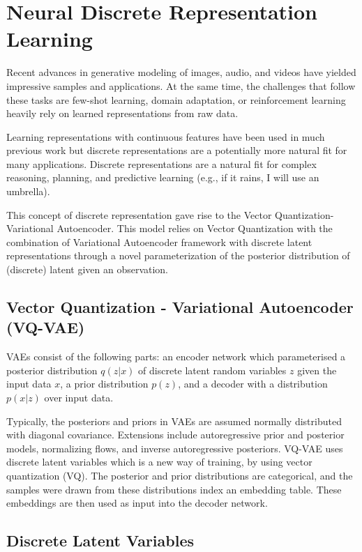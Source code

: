 \section{Neural Discrete Representation Learning}

Recent advances in generative modeling of images, audio, and videos have yielded impressive
samples and applications. At the same time, the challenges that follow these tasks are few-shot
learning, domain adaptation, or reinforcement learning heavily rely on learned representations from raw data.

Learning representations with continuous features have been used in much previous work but discrete representations are a potentially more natural fit for many applications. 
Discrete representations are a natural fit for complex reasoning, planning, and predictive learning
(e.g., if it rains, I will use an umbrella).

This concept of discrete representation gave rise to the Vector Quantization-Variational Autoencoder. 
This model relies on Vector Quantization with the combination of Variational Autoencoder framework with 
discrete latent representations through a novel parameterization of the posterior distribution of (discrete) 
latent given an observation.~\cite{oord2018neural}

\subsection{Vector Quantization - Variational Autoencoder (VQ-VAE)}

VAEs consist of the following parts: an encoder network which parameterised a posterior  
distribution $q(z|x)$ of discrete latent random variables $z$ given the input data $x$, a prior
distribution $p(z)$, and a decoder with a distribution $p(x|z)$ over input data.

Typically, the posteriors and priors in VAEs are assumed normally distributed with diagonal covariance. Extensions include autoregressive prior and posterior models, normalizing flows, 
and inverse autoregressive posteriors. VQ-VAE uses discrete latent variables which is a new way of training, by using vector quantization (VQ). The posterior and prior distributions are categorical, and the samples were drawn from these distributions index an embedding table. These embeddings
are then used as input into the decoder network.

\subsection{Discrete Latent Variables}

